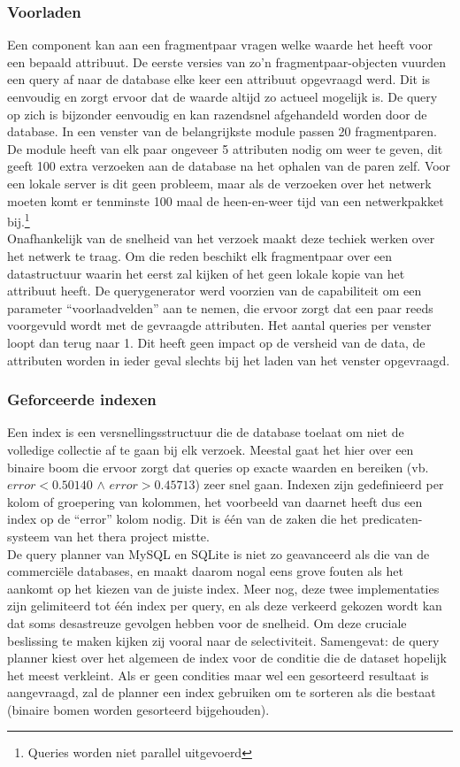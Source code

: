 \subsubsection{Voorladen}
Een component kan aan een fragmentpaar vragen welke waarde het heeft voor een bepaald attribuut. De eerste versies van zo'n fragmentpaar-objecten vuurden een query af naar de database elke keer een attribuut opgevraagd werd. Dit is eenvoudig en zorgt ervoor dat de waarde altijd zo actueel mogelijk is. De query op zich is bijzonder eenvoudig en kan razendsnel afgehandeld worden door de database. In een venster van de belangrijkste module passen 20 fragmentparen. De module heeft van elk paar ongeveer 5 attributen nodig om weer te geven, dit geeft 100 extra verzoeken aan de database na het ophalen van de paren zelf. Voor een lokale server is dit geen probleem, maar als de verzoeken over het netwerk moeten komt er tenminste 100 maal de heen-en-weer tijd van een netwerkpakket bij.\footnote{Queries worden niet parallel uitgevoerd}\\

Onafhankelijk van de snelheid van het verzoek maakt deze techiek werken over het netwerk te traag. Om die reden beschikt elk fragmentpaar over een datastructuur waarin het eerst zal kijken of het geen lokale kopie van het attribuut heeft. De querygenerator werd voorzien van de capabiliteit om een parameter ``voorlaadvelden'' aan te nemen, die ervoor zorgt dat een paar reeds voorgevuld wordt met de gevraagde attributen. Het aantal queries per venster loopt dan terug naar 1. Dit heeft geen impact op de versheid van de data, de attributen worden in ieder geval slechts bij het laden van het venster opgevraagd.

\subsubsection{Geforceerde indexen}
Een index is een versnellingsstructuur die de database toelaat om niet de volledige collectie af te gaan bij elk verzoek. Meestal gaat het hier over een binaire boom die ervoor zorgt dat queries op exacte waarden en bereiken (vb. $error < 0.50140$ $\land$ $error > 0.45713$) zeer snel gaan. Indexen zijn gedefinieerd per kolom of groepering van kolommen, het voorbeeld van daarnet heeft dus een index op de ``error'' kolom nodig. Dit is \'e\'en van de zaken die het predicaten-systeem van het thera project mistte.\\

De query planner van MySQL en SQLite is niet zo geavanceerd als die van de commerci\"ele databases, en maakt daarom nogal eens grove fouten als het aankomt op het kiezen van de juiste index. Meer nog, deze twee implementaties zijn gelimiteerd tot \'e\'en index per query, en als deze verkeerd gekozen wordt kan dat soms desastreuze gevolgen hebben voor de snelheid. Om deze cruciale beslissing te maken kijken zij vooral naar de selectiviteit. Samengevat: de query planner kiest over het algemeen de index voor de conditie die de dataset hopelijk het meest verkleint. Als er geen condities maar wel een gesorteerd resultaat is aangevraagd, zal de planner een index gebruiken om te sorteren als die bestaat (binaire bomen worden gesorteerd bijgehouden).\\

